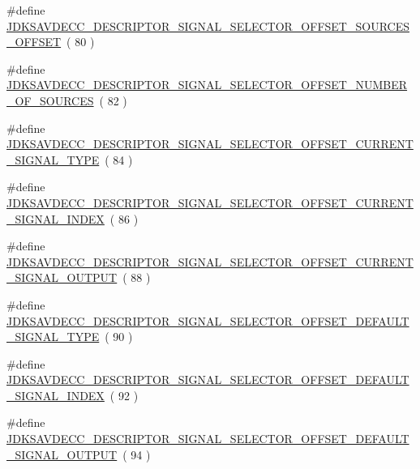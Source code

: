 \begin{DoxyCompactItemize}
\item 
\#define \hyperlink{group__descriptor__signal__selector_ga8bbcb1151a60449cb0887acfbdb96a32}{J\+D\+K\+S\+A\+V\+D\+E\+C\+C\+\_\+\+D\+E\+S\+C\+R\+I\+P\+T\+O\+R\+\_\+\+S\+I\+G\+N\+A\+L\+\_\+\+S\+E\+L\+E\+C\+T\+O\+R\+\_\+\+O\+F\+F\+S\+E\+T\+\_\+\+S\+O\+U\+R\+C\+E\+S\+\_\+\+O\+F\+F\+S\+ET}~( 80 )
\item 
\#define \hyperlink{group__descriptor__signal__selector_ga5833ebb9e98cdb8760dbef78b22ee895}{J\+D\+K\+S\+A\+V\+D\+E\+C\+C\+\_\+\+D\+E\+S\+C\+R\+I\+P\+T\+O\+R\+\_\+\+S\+I\+G\+N\+A\+L\+\_\+\+S\+E\+L\+E\+C\+T\+O\+R\+\_\+\+O\+F\+F\+S\+E\+T\+\_\+\+N\+U\+M\+B\+E\+R\+\_\+\+O\+F\+\_\+\+S\+O\+U\+R\+C\+ES}~( 82 )
\item 
\#define \hyperlink{group__descriptor__signal__selector_ga7ea801b6071949b8cec01a441ebd2adb}{J\+D\+K\+S\+A\+V\+D\+E\+C\+C\+\_\+\+D\+E\+S\+C\+R\+I\+P\+T\+O\+R\+\_\+\+S\+I\+G\+N\+A\+L\+\_\+\+S\+E\+L\+E\+C\+T\+O\+R\+\_\+\+O\+F\+F\+S\+E\+T\+\_\+\+C\+U\+R\+R\+E\+N\+T\+\_\+\+S\+I\+G\+N\+A\+L\+\_\+\+T\+Y\+PE}~( 84 )
\item 
\#define \hyperlink{group__descriptor__signal__selector_gaaf6bbba55057ac8f132312c6ab9cfd36}{J\+D\+K\+S\+A\+V\+D\+E\+C\+C\+\_\+\+D\+E\+S\+C\+R\+I\+P\+T\+O\+R\+\_\+\+S\+I\+G\+N\+A\+L\+\_\+\+S\+E\+L\+E\+C\+T\+O\+R\+\_\+\+O\+F\+F\+S\+E\+T\+\_\+\+C\+U\+R\+R\+E\+N\+T\+\_\+\+S\+I\+G\+N\+A\+L\+\_\+\+I\+N\+D\+EX}~( 86 )
\item 
\#define \hyperlink{group__descriptor__signal__selector_ga084a251846ebcab83fdf3b594629a5d3}{J\+D\+K\+S\+A\+V\+D\+E\+C\+C\+\_\+\+D\+E\+S\+C\+R\+I\+P\+T\+O\+R\+\_\+\+S\+I\+G\+N\+A\+L\+\_\+\+S\+E\+L\+E\+C\+T\+O\+R\+\_\+\+O\+F\+F\+S\+E\+T\+\_\+\+C\+U\+R\+R\+E\+N\+T\+\_\+\+S\+I\+G\+N\+A\+L\+\_\+\+O\+U\+T\+P\+UT}~( 88 )
\item 
\#define \hyperlink{group__descriptor__signal__selector_ga796b4ac503bf21bde5e85cdc006dfdcb}{J\+D\+K\+S\+A\+V\+D\+E\+C\+C\+\_\+\+D\+E\+S\+C\+R\+I\+P\+T\+O\+R\+\_\+\+S\+I\+G\+N\+A\+L\+\_\+\+S\+E\+L\+E\+C\+T\+O\+R\+\_\+\+O\+F\+F\+S\+E\+T\+\_\+\+D\+E\+F\+A\+U\+L\+T\+\_\+\+S\+I\+G\+N\+A\+L\+\_\+\+T\+Y\+PE}~( 90 )
\item 
\#define \hyperlink{group__descriptor__signal__selector_ga67224111ec296c0d3031aa95691bcb18}{J\+D\+K\+S\+A\+V\+D\+E\+C\+C\+\_\+\+D\+E\+S\+C\+R\+I\+P\+T\+O\+R\+\_\+\+S\+I\+G\+N\+A\+L\+\_\+\+S\+E\+L\+E\+C\+T\+O\+R\+\_\+\+O\+F\+F\+S\+E\+T\+\_\+\+D\+E\+F\+A\+U\+L\+T\+\_\+\+S\+I\+G\+N\+A\+L\+\_\+\+I\+N\+D\+EX}~( 92 )
\item 
\#define \hyperlink{group__descriptor__signal__selector_ga3f9a9848a43728f0dddf6bc50e06aafc}{J\+D\+K\+S\+A\+V\+D\+E\+C\+C\+\_\+\+D\+E\+S\+C\+R\+I\+P\+T\+O\+R\+\_\+\+S\+I\+G\+N\+A\+L\+\_\+\+S\+E\+L\+E\+C\+T\+O\+R\+\_\+\+O\+F\+F\+S\+E\+T\+\_\+\+D\+E\+F\+A\+U\+L\+T\+\_\+\+S\+I\+G\+N\+A\+L\+\_\+\+O\+U\+T\+P\+UT}~( 94 )

\end{DoxyCompactItemize}
